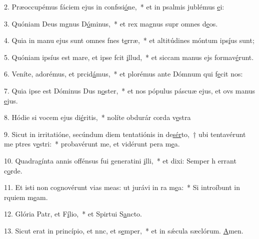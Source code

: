 2. Præoccupémus fáciem ejus in confssi\uline{ó}ne,~* et in psalmis jublémus \uline{e}i:\par 
3. Quóniam Deus mgnus D\uline{ó}minus,~* et rex magnus supr omnes d\uline{e}os.\par 
4. Quia in manu ejus sunt omnes fnes t\uline{e}rræ,~* et altitúdines móntum ips\uline{í}us sunt;\par 
5. Quóniam ipsíus est mare, et ipse fcit \uline{i}llud,~* et siccam manus ejs formav\uline{é}runt.\par 
6. Veníte, adorémus, et prcid\uline{á}mus,~* et plorémus ante Dómnum qui f\uline{e}cit nos:\par 
7. Quia ipse est Dóminus Dus n\uline{o}ster,~* et nos pópulus páscuæ ejus, et ovs manus \uline{e}jus.\par 
8. Hódie si vocem ejus di\uline{é}ritis,~* nolíte obdurár corda v\uline{e}stra\par 
9. Sicut in irritatióne, secúndum diem tentatiónis in de\uline{sér}to,~† ubi tentavérunt me ptres v\uline{e}stri:~* probavérunt me, et vidérunt pera m\uline{e}a.\par 
10. Quadragínta annis offénsus fui generatini \uline{i}lli,~* et dixi: Semper h errant c\uline{o}rde.\par 
11. Et isti non cognovérunt vias meas: ut jurávi in ra m\uline{e}a:~* Si introíbunt in rquiem m\uline{e}am.\par 
12. Glória Patr, et F\uline{í}lio,~* et Spirtui S\uline{a}ncto.\par 
13. Sicut erat in princípio, et nnc, et s\uline{e}mper,~* et in sǽcula sæclórum. \uline{A}men.\par 
